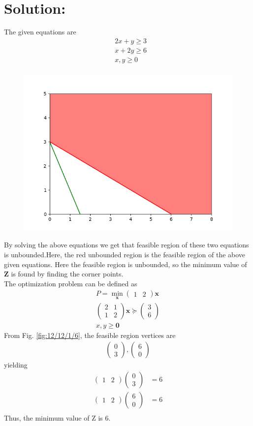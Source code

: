 \documentclass[a4paper,12pt,twocolumn]{article}
\let\vec\mathbf
\newcommand{\myvec}[1]{\ensuremath{\begin{pmatrix}#1\end{pmatrix}}}
\begin{document}
\section{Solution:}
The given equations are
\begin{align*}
&2x+y\ge3\\
&x+2y\ge6\\
&x,y\ge0\\
\end{align*}
\begin{figure}[h]
     \includegraphics[width=\linewidth]{figures/optimize.png}
\end{figure}
By solving the above equations we get that feasible region of  these two equations is unbounded.Here, the red unbounded region is the feasible region of the above given equations. Here the feasible region is unbounded, so the minimum value of $\vec{Z}$ is found by finding the corner points.\\
\fi
The optimization problem can be defined as
\begin{align}
	P = \min_{\vec{x}}\myvec{1 &2}\vec{x}
	\\
	\myvec{2 &1 \\ 1 & 2} \vec{x}\succeq \myvec{3 \\ 6}
	\\
x,y \ge \vec{0}
\end{align}
From Fig. 
		\ref{fig:12/12/1/6},
				the feasible region vertices are
\begin{align}
\myvec{0 \\ 3 },
\myvec{6 \\ 0}
\end{align}
yielding
\begin{align}
	\myvec{1 &2}\myvec{0 \\ 3} &= 6 \\
	\myvec{1 &2}\myvec{6 \\ 0} &= 6 \\
\end{align}
Thus, the minimum value of Z is 6.
\end{document}
